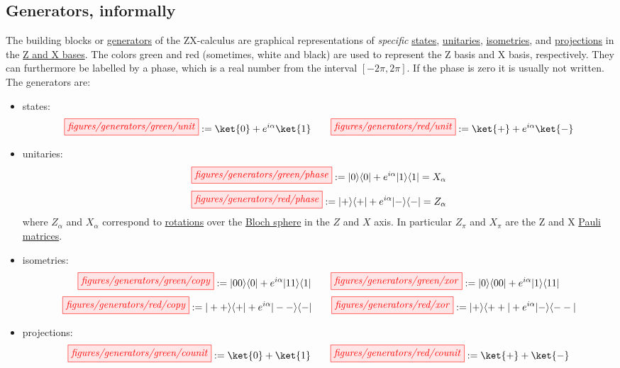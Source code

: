 \documentclass[a4paper, 12pt]{article}
\begin{document}

\subsection{Generators, informally}

The building blocks or \underline{generators} of the ZX-calculus are graphical
representations of \emph{specific} \underline{states}, \underline{unitaries},
\underline{isometries}, and \underline{projections} in the \underline{Z and X
  bases}.
The colors green and red (sometimes, white and black) are used to represent the
Z basis and X basis, respectively.
They can furthermore be labelled by a phase, which is a real number from the
interval $[-2\pi, 2\pi]$.
If the phase is zero it is usually not written.
The generators are:
\begin{itemize}
\item states:
  \begin{equation*}
    \tikzfig{figures/generators/green/unit} := \ket{0} + e^{i \alpha} \ket{1} 
    \qquad
    \tikzfig{figures/generators/red/unit} := \ket{+} + e^{i \alpha} \ket{-}
  \end{equation*}

\item unitaries:
  \begin{equation*}
    \tikzfig{figures/generators/green/phase} := | 0 \rangle \langle 0 | + e^{i \alpha} | 1 \rangle \langle 1 | = X_\alpha
  \end{equation*}
  \vspace{1mm}
  \begin{equation*}
    \tikzfig{figures/generators/red/phase} := | + \rangle \langle + | + e^{i \alpha} | - \rangle \langle - | = Z_\alpha
  \end{equation*}
  where $Z_\alpha$ and $X_\alpha$ correspond to \underline{rotations} over the
  \underline{Bloch sphere}  in the $Z$ and $X$ axis. In particular $Z_\pi$ and
  $X_\pi$ are the Z and X \underline{Pauli matrices}.

\item isometries:
  \begin{equation*}
    \tikzfig{figures/generators/green/copy} := | 00 \rangle \langle 0 | + e^{i \alpha} |11 \rangle \langle 1 |
    \qquad
    \tikzfig{figures/generators/green/xor} := | 0 \rangle \langle 00 | + e^{i \alpha} | 1 \rangle \langle 11 |
  \end{equation*}
  \begin{equation*}
    \tikzfig{figures/generators/red/copy} := | ++ \rangle \langle + | + e^{i \alpha} |-- \rangle \langle - |
    \qquad
    \tikzfig{figures/generators/red/xor} := | + \rangle \langle ++ | + e^{i \alpha} | - \rangle \langle -- |
  \end{equation*}

\item projections:
  \begin{equation*}
    \tikzfig{figures/generators/green/counit} := \ket{0} + \ket{1}
    \qquad
    \tikzfig{figures/generators/red/counit} := \ket{+} + \ket{-}
  \end{equation*}
\end{itemize}
\end{document}
